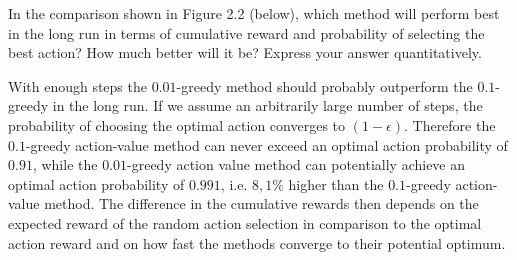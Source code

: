 
\begin{exercise}[Exercise 2.3]

In the comparison shown in Figure 2.2 (below), which method will perform best in
the long run in terms of cumulative reward and probability of selecting the best
action? How much better will it be? Express your answer quantitatively.


\end{exercise}


\begin{solution}

With enough steps the $0.01$-greedy method should probably outperform the
$0.1$-greedy in the long run. If we assume an arbitrarily large number of steps,
the probability of choosing the optimal action converges to $(1 - \epsilon)$.
Therefore the $0.1$-greedy action-value method can never exceed an optimal action
probability of $0.91$, while the $0.01$-greedy action value method can potentially
achieve an optimal action probability of $0.991$, i.e. $8,1\%$ higher than the
$0.1$-greedy action-value method.
The difference in the cumulative rewards then depends on the expected reward of
the random action selection in comparison to the optimal action reward and on
how fast the methods converge to their potential optimum.

\end{solution}

